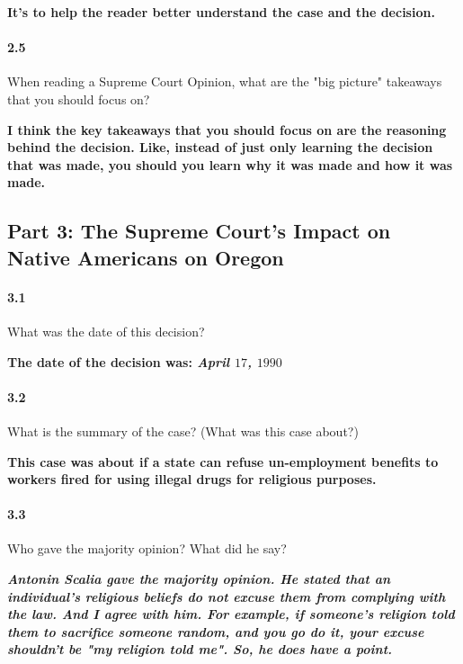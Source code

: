 \bf{It’s to help the reader better understand the case and the decision.}


\paragraph{2.5} When reading a Supreme Court Opinion, what are the "big picture"
takeaways that you should focus on?

\bf{I think the key takeaways that you should focus on are the reasoning behind
the decision. Like, instead of just only learning the decision that was made,
you should you learn why it was made and how it was made.}

\newpage

\subsection{Part 3: The Supreme Court’s Impact on Native Americans on Oregon}


\paragraph{3.1} What was the date of this decision?

\bf{The date of the decision was: \it{April} $17$, $1990$}


\paragraph{3.2} What is the summary of the case? (What was this case about?)

\bf{This case was about if a state can refuse un-employment benefits
to workers fired for using illegal drugs for religious purposes.}


\paragraph{3.3} Who gave the majority opinion? What did he say?

\bf{\it{Antonin Scalia} gave the majority opinion. He stated that an
individual’s religious beliefs do not excuse them from complying with the law.
And I agree with him. For example, if someone's religion told them to sacrifice
someone random, and you go do it, your excuse shouldn't be "my religion told
me". So, he does have a point.}

